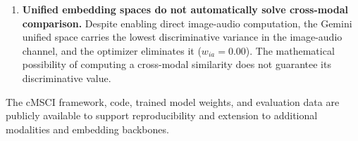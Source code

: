 \begin{enumerate}
\item \textbf{Unified embedding spaces do not automatically solve cross-modal comparison.} Despite enabling direct image-audio computation, the Gemini unified space carries the lowest discriminative variance in the image-audio channel, and the optimizer eliminates it ($w_{ia} = 0.00$). The mathematical possibility of computing a cross-modal similarity does not guarantee its discriminative value.
\end{enumerate}

The cMSCI framework, code, trained model weights, and evaluation data are publicly available to support reproducibility and extension to additional modalities and embedding backbones.
